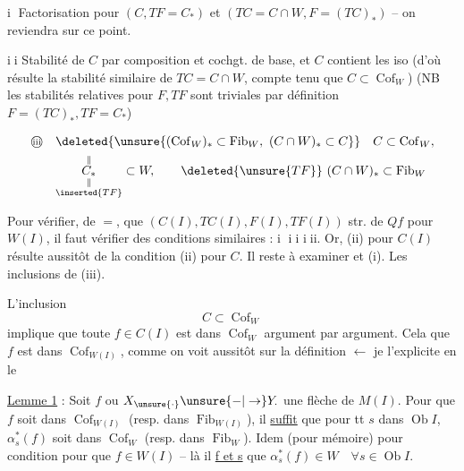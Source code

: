 \textcircled{\scriptsize i} Factorisation pour $(C,TF=C_{*})$ et $(TC=C\cap W,F=(TC)_{*})$ -- on reviendra sur ce point.

\textcircled{\scriptsize ii} Stabilité de $C$ par composition et cochgt. de base, et $C$ contient les iso (d'où résulte la stabilité similaire de $TC=C\cap W$, compte tenu que $C\subset\operatorname{Cof}_{W}$) (NB les stabilités relatives pour $F,TF$ sont triviales par définition $F=(TC)_{*},TF=C_{*}$)

\[
\begin{aligned}
\text{\textcircled{\scriptsize iii}}\quad&
\deleted{\unsure{(\operatorname{Cof}_{W})_{*}\subset\operatorname{Fib}_{W},\ (C\cap W)_{*}\subset C}}\quad C\subset\operatorname{Cof}_{W},\\
&\underset{\substack{\Vert\\\inserted{TF}}}{\overset{\Vert}{C_{*}}}\subset W,\qquad \deleted{\unsure{TF}}\ (C\cap W)_{*}\subset\operatorname{Fib}_{W}
\end{aligned}
\]

Pour vérifier, de $=$,  que  $(C(I),TC(I),F(I),TF(I))$   str. de $Qf$ pour   $W(I)$, il faut vérifier des conditions similaires : \textcircled{\scriptsize i} \textcircled{\scriptsize ii} \textcircled{\scriptsize iii}.  Or, (ii) pour $C(I)$ résulte aussitôt de la condition (ii) pour $C$. Il reste à examiner  et (i).
\begingroup\makeatletter\tagsleft@true\makeatother
Les inclusions de (iii).

L'inclusion
\[
 C\subset\operatorname{Cof}_{W}
\]
implique que toute $f\in C(I)$ est dans $\operatorname{Cof}_{W}$ argument par argument. Cela  que $f$ est dans $\operatorname{Cof}_{W(I)}$, comme on voit aussitôt sur la définition $\leftarrow$ je l'explicite en le

\uline{Lemme 1} : Soit $f$ ou $X_{\unsure{\cdot}}\unsure{-|\to}Y_{\cdot}$ une flèche de $M(I)$. Pour que $f$ soit dans $\operatorname{Cof}_{W(I)}$ (resp. dans $\operatorname{Fib}_{W(I)}$), il \uline{suffit} que pour tt $s$ dans $\operatorname{Ob} I$, $\alpha_{s}^{*}(f)$ soit dans $\operatorname{Cof}_{W}$ (resp. dans $\operatorname{Fib}_{W}$). Idem (pour mémoire) pour  condition pour que  $f\in W(I)$ -- là il \uline{f et s} que $\alpha_{s}^{*}(f)\in W\quad\forall s\in\operatorname{Ob}I$.


